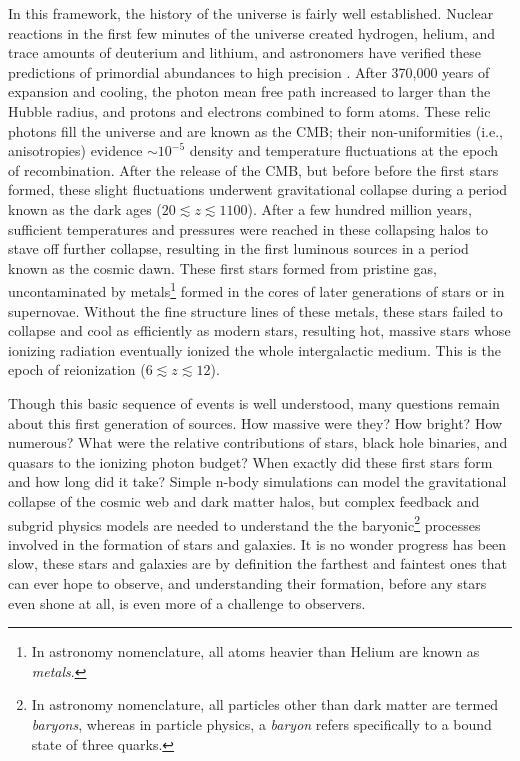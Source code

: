 In this framework, the history of the universe is fairly well established. Nuclear reactions in the first few minutes of the universe created hydrogen, helium, and trace amounts of deuterium and lithium, and astronomers have verified these predictions of primordial abundances to high precision \citep{bbn}. After 370,000 years of expansion and cooling, the photon mean free path increased to larger than the Hubble radius, and protons and electrons combined to form atoms. These relic photons fill the universe and are known as the CMB; their non-uniformities (i.e., anisotropies) evidence $\sim10^{-5}$ density and temperature fluctuations at the epoch of recombination. After the release of the CMB, but before before the first stars formed, these slight fluctuations underwent gravitational collapse during a period known as the dark ages ($20\lesssim z\lesssim 1100$). After a few hundred million years, sufficient temperatures and pressures were reached in these collapsing halos to stave off further collapse, resulting in the first luminous sources in a period known as the cosmic dawn. These first stars formed from pristine gas, uncontaminated by metals\footnote{In astronomy nomenclature, all atoms heavier than Helium are known as \textit{metals}.} formed in the cores of later generations of stars or in supernovae. Without the fine structure lines of these metals, these stars failed to collapse and cool as efficiently as modern stars, resulting hot, massive stars whose ionizing radiation eventually ionized the whole intergalactic medium. This is the epoch of reionization ($6\lesssim z\lesssim12$).

Though this basic sequence of events is well understood, many questions remain about this first generation of sources. How massive were they? How bright? How numerous? What were the relative contributions of stars, black hole binaries, and quasars to the ionizing photon budget? When exactly did these first stars form and how long did it take? Simple n-body simulations can model the gravitational collapse of the cosmic web and dark matter halos, but complex feedback and subgrid physics models are needed to understand the the baryonic\footnote{In astronomy nomenclature, all particles other than dark matter are termed \textit{baryons}, whereas in particle physics, a \textit{baryon} refers specifically to a bound state of three quarks.} processes involved in the formation of stars and galaxies. It is no wonder progress has been slow, these stars and galaxies are by definition the farthest and faintest ones that can ever hope to observe, and understanding their formation, before any stars even shone at all, is even more of a challenge to observers. 

